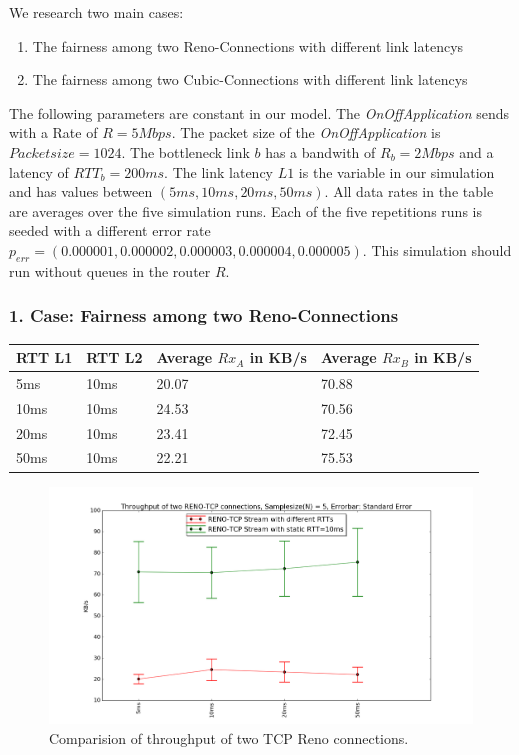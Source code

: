 
We research two main cases:
\begin{enumerate}
\item  The fairness among two Reno-Connections with different link latencys
\item The fairness among two Cubic-Connections with different link latencys
\end{enumerate}
The following parameters are constant in our model. The \textit{OnOffApplication} sends with a Rate of $R=5Mbps$. The packet size of the \textit{OnOffApplication} is $Packet size = 1024$. The bottleneck link $b$ has a bandwith of $R_b = 2Mbps$ and a latency of $RTT_b = 200ms$. The link latency $L1$ is the variable in our simulation and has values between $(5ms, 10ms, 20ms, 50ms)$. All data rates in the table are averages over the five simulation runs. Each of the five repetitions runs is seeded with a different error rate $p_{err} = (0.000001, 0.000002, 0.000003, 0.000004, 0.000005)$. This simulation should run without queues in the router $R$.

\subsubsection*{1. Case: Fairness among two Reno-Connections}


\begin{table}[H]
\centering
\begin{tabular}{|l|l|l|l|}
\hline
\textbf{RTT L1} & \textbf{RTT L2} & \textbf{Average $Rx_A$ in KB/s} & \textbf{Average $Rx_B$ in KB/s} \\ \hline
5ms             & 10ms            &          20.07               &         70.88                \\ \hline
10ms            & 10ms            &         24.53                &           70.56              \\ \hline
20ms            & 10ms            &         23.41                &         72.45                \\ \hline
50ms            & 10ms            &          22.21               &           75.53              \\ \hline
\end{tabular}
\end{table}

\begin{figure}[H]
	\centering
	\includegraphics[width=6in]{img/reno.png}
	\caption[reno]
	{Comparision of throughput of two TCP Reno connections.}
\end{figure}

